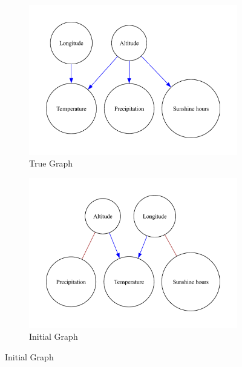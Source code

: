 \documentclass{article}
\begin{document}
\begin{figure}[H]
    \centering
    \begin{subfigure}{0.3\textwidth}
        \centering
        \vspace{-0.5cm}
        \includegraphics[width=\linewidth]{data/dataset/DWD/output_graph/true_graph.pdf}
        \vfill
        \caption{True Graph}
        \label{fig:sub1}
    \end{subfigure}
    \hspace{0.04\textwidth}
    \begin{subfigure}{0.3\textwidth}
        \centering
        \vspace{-0.5cm}
        \includegraphics[width=\linewidth]{data/dataset/DWD/output_graph/initial_graph.pdf}
        \vfill
        \caption{Initial Graph}

\end{subfigure}
\end{figure}
\end{document}
